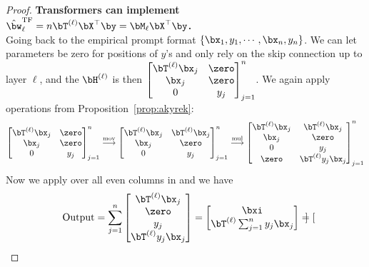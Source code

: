\begin{proof}
\textbf{Transformers can implement $\hat{\bw}_\ell^\mathrm{TF} = n\bT^{(\ell)} \bX^\top \by = \bM_\ell \bX^\top \by$.}\\
Going back to the empirical prompt format $\{\bx_1, y_1, \cdots, \bx_n, y_n\}$. We can let parameters be zero for positions of $y$'s and only rely on the skip connection up to layer $\ell$, and the $\bH^{(\ell)}$ is then $\begin{bmatrix}
           \bT^{(\ell)} \bx_j & \zero  \\
            \bx_j &  \zero \\
            0 & y_j
        \end{bmatrix}_{j=1}^n $. We again apply operations from Proposition~\ref{prop:akyrek}:
\begin{equation}
    \begin{bmatrix}
           \bT^{(\ell)} \bx_j & \zero  \\
            \bx_j &  \zero \\
            0 & y_j
        \end{bmatrix}_{j=1}^n \overset{\mathrm{mov}}{\longrightarrow} \begin{bmatrix}
           \bT^{(\ell)} \bx_j & \bT^{(\ell)} \bx_j  \\
            \bx_j & \zero \\
            0 & y_j
        \end{bmatrix}_{j=1}^n \overset{\mathrm{mul}}{\longrightarrow} \begin{bmatrix}
            \bT^{(\ell)} \bx_j & \bT^{(\ell)}\bx_j  \\
             \bx_j & \zero \\
             0 & y_j \\
        \zero & \bT^{(\ell)} y_j \bx_j 
        \end{bmatrix}_{j=1}^n 
\label{eqn:Tyjxj}
\end{equation}
Now we apply  over all even columns in  and we have 
\begin{equation}
    \mathrm{Output} = \sum_{j=1}^n \begin{bmatrix}
         \bT^{(\ell)}\bx_j \\ \zero \\ y_j \\  \bT^{(\ell)} y_j \bx_j 
    \end{bmatrix} = \begin{bmatrix}
        \bxi \\ \bT^{(\ell)} \sum_{j=1}^n y_j \bx_j 
    \end{bmatrix} = \begin{bmatrix}

\end{bmatrix}
\end{equation}
\end{proof}
